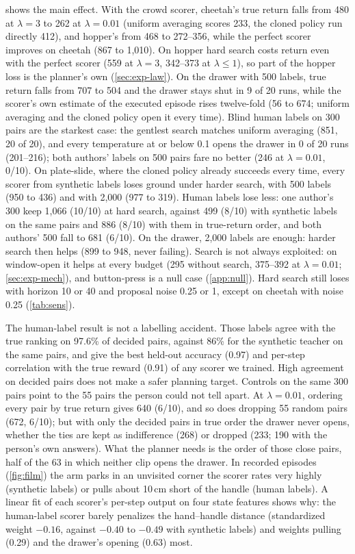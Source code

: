 \documentclass{article}
\theoremstyle{plain}
\theoremstyle{remark}
\begin{document}
 shows the main effect. With the crowd scorer, cheetah's true return falls from 480 at $\lambda=3$ to
262 at $\lambda=0.01$ (uniform averaging scores 233, the cloned policy run directly 412), and hopper's from 468 to 272--356, while the perfect scorer
improves on cheetah (867 to 1,010). On hopper hard search costs return even with the perfect scorer (559 at
$\lambda=3$, 342--373 at $\lambda\le1$), so part of the hopper loss is the planner's own (\cref{sec:exp-law}). On the drawer with 500 labels, true return falls from 707 to 504 and the
drawer stays shut in 9 of 20 runs, while the scorer's own estimate of the executed episode rises twelve-fold (56 to
674; uniform averaging and the cloned policy open it every time). Blind human
labels on 300 pairs are the starkest case: the gentlest search matches uniform averaging (851, 20 of 20), and every
temperature at or below 0.1 opens the drawer in 0 of 20 runs (201--216); both authors' labels on 500 pairs fare no
better (246 at $\lambda=0.01$, 0/10). On plate-slide, where the cloned policy already succeeds every time, every scorer
from synthetic labels loses ground under harder search, with 500 labels (950 to 436) and with 2,000 (977 to 319).
Human labels lose less: one author's 300 keep 1,066 (10/10) at hard search, against 499 (8/10) with synthetic labels
on the same pairs and 886 (8/10) with them in true-return order, and both authors' 500 fall to 681 (6/10).
On the drawer, 2,000 labels are enough: harder search then helps (899 to 948, never failing).
Search is not always exploited: on window-open it helps at every budget (295 without search, 375--392 at
$\lambda=0.01$; \cref{sec:exp-mech}), and button-press is a null
case (\cref{app:null}). Hard search still loses with horizon 10 or 40 and proposal noise 0.25 or 1, except on
cheetah with noise 0.25 (\cref{tab:sens}).

The human-label result is not a labelling accident. Those labels agree with the true ranking on 97.6\% of decided
pairs, against 86\% for the synthetic teacher on the same pairs, and give the best held-out accuracy (0.97) and
per-step correlation with the true reward (0.91) of any scorer we trained. High agreement on decided pairs does not make a safer planning target. Controls on the same
300 pairs point to the 55 pairs the person could not tell apart. At $\lambda=0.01$, ordering every pair by true return
gives 640 (6/10), and so does dropping 55 random pairs (672, 6/10); but with only the decided pairs in true order the
drawer never opens, whether the ties are kept as indifference (268) or dropped (233; 190 with the person's own
answers). What the planner needs is the order of those close pairs, half of the 63 in which neither clip opens the
drawer. In recorded episodes (\cref{fig:film}) the arm parks in an unvisited corner the
scorer rates very highly (synthetic labels) or pulls about 10\,cm short of the handle (human labels). A linear fit of each scorer's per-step output on four state features shows why: the human-label
scorer barely penalizes the hand--handle distance (standardized weight $-0.16$, against $-0.40$ to $-0.49$ with
synthetic labels) and weights pulling (0.29) and the drawer's opening (0.63) most.
\end{document}
